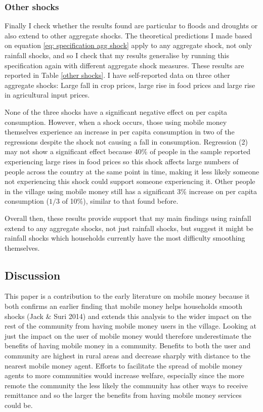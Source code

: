 
 
\subsubsection{Other shocks}
Finally I check whether the results found are particular to floods and droughts or also extend to other aggregate shocks. The theoretical predictions I made based on equation \eqref{eq: specification agg shock} apply to any aggregate shock, not only rainfall shocks, and so I check that my results generalise by running this specification again with different aggregate shock measures. These results are reported in Table \ref{other shocks}. I have self-reported data on three other aggregate shocks: Large fall in crop prices, large rise in food prices and large rise in agricultural input prices. 

None of the three shocks have a significant negative effect on per capita consumption. However, when a shock occurs, those using mobile money themselves experience an increase in per capita consumption in two of the regressions despite the shock not causing a fall in consumption. Regression (2) may not show a significant effect because 40\% of people in the sample reported experiencing large rises in food prices so this shock affects large numbers of people across the country at the same point in time, making it less likely someone not experiencing this shock could support someone experiencing it. Other people in the village using mobile money still has a  significant 3\% increase on per capita consumption ($1/3$ of 10\%), similar to that found before. 

Overall then, these results provide support that my main findings using rainfall extend to any aggregate shocks, not just rainfall shocks, but suggest it might be rainfall shocks which households currently have the most difficulty smoothing themselves. 



\subsection{Discussion} 
This paper is a contribution to the early literature on mobile money because it both confirms an earlier finding that mobile money helps households smooth  shocks (Jack \& Suri 2014) and extends this analysis to the wider impact on the rest of the community from having mobile money users in the village. Looking at just the impact on the user of mobile money would therefore underestimate the benefits of having mobile money in a community. Benefits to both the user and community are highest in rural areas and decrease sharply with distance to the nearest mobile money agent. Efforts to facilitate the spread of mobile money agents to more communities would increase welfare, especially since the more remote the community the less likely the community has other ways to receive remittance and so the larger the benefits from having mobile money services could be. 

